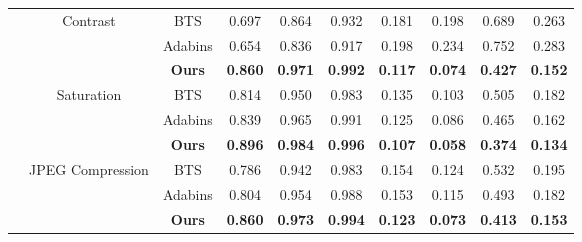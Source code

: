 \documentclass{article}
\begin{document}
\begin{table*}[!htbp]
{\begin{tabular}{l | c | c | ccccccc}
      &  \multirow{3}{*}{Contrast} & BTS & 0.697 & 0.864 & 0.932 & 0.181 & 0.198 & 0.689 & 0.263 \\
                                & & Adabins & 0.654 & 0.836 & 0.917 & 0.198 & 0.234 & 0.752 & 0.283\\
& & \textbf{Ours} & \textbf{0.860} & \textbf{0.971} & \textbf{0.992} & \textbf{0.117} & \textbf{0.074} & \textbf{0.427} & \textbf{0.152} \\ \cmidrule{2-10}
    &  \multirow{3}{*}{Saturation} & BTS & 0.814 & 0.950 & 0.983 & 0.135 & 0.103 & 0.505 & 0.182 \\
                                & & Adabins & 0.839 & 0.965 & 0.991 & 0.125 & 0.086 & 0.465 & 0.162 \\
& & \textbf{Ours} & \textbf{0.896} & \textbf{0.984} & \textbf{0.996} & \textbf{0.107} & \textbf{0.058} & \textbf{0.374} & \textbf{0.134}\\ \cmidrule{2-10}
    &  \multirow{3}{*}{JPEG Compression} & BTS & 0.786 & 0.942 & 0.983 & 0.154 & 0.124 & 0.532 & 0.195 \\
                                & & Adabins & 0.804 & 0.954 & 0.988 & 0.153 & 0.115 & 0.493 & 0.182 \\
& & \textbf{Ours} & \textbf{0.860} & \textbf{0.973} & \textbf{0.994} & \textbf{0.123} & \textbf{0.073} & \textbf{0.413} & \textbf{0.153} \\ \midrule                   
                            

\end{tabular}}
\end{table*}
\end{document}

